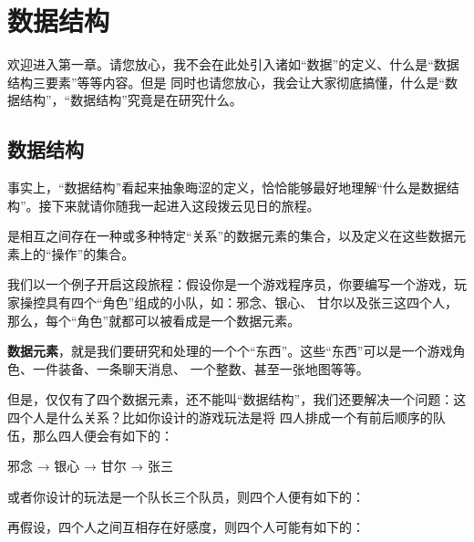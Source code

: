 \chapter{数据结构}
欢迎进入第一章。请您放心，我不会在此处引入诸如“数据”的定义、什么是“数据结构三要素”等等内容。但是
同时也请您放心，我会让大家彻底搞懂，什么是“数据结构”，“数据结构”究竟是在研究什么。%

\section{数据结构}
事实上，“数据结构”看起来抽象晦涩的定义，恰恰能够最好地理解“什么是数据结构”。接下来就请你随我一起进入这段拨云见日的旅程。
\begin{definitionbox}
    是相互之间存在一种或多种特定“关系”的数据元素的集合，以及定义在这些数据元素上的“操作”的集合。
\end{definitionbox}
我们以一个例子开启这段旅程：假设你是一个游戏程序员，你要编写一个游戏，玩家操控具有四个“角色”组成的小队，如：邪念、银心、
甘尔以及张三这四个人，那么，每个“角色”就都可以被看成是一个数据元素。
\begin{intuitionbox}
\textbf{数据元素}，就是我们要研究和处理的一个个“东西”。这些“东西”可以是一个游戏角色、一件装备、一条聊天消息、
一个整数、甚至一张地图等等。
\end{intuitionbox}
但是，仅仅有了四个数据元素，还不能叫“数据结构”，我们还要解决一个问题：这四个人是什么关系？比如你设计的游戏玩法是将
四人排成一个有前后顺序的队伍，那么四人便会有如下的：
\begin{bulk}
\begin{center}
邪念 → 银心 → 甘尔 → 张三
\end{center}
\end{bulk}
或者你设计的玩法是一个队长三个队员，则四个人便有如下的：
\begin{bulk}
\begin{center}
\end{center}
\end{bulk}
再假设，四个人之间互相存在好感度，则四个人可能有如下的：

